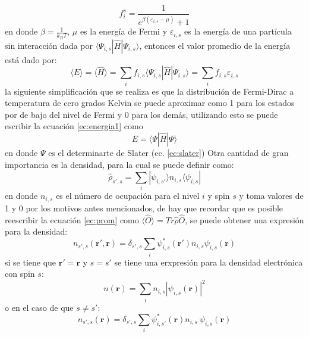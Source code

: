 \documentclass[12pt,a4paper, oneside]{book}
\begin{document}
	\begin{equation}
	f_{i}^{s}= \frac{1}{e^{\beta (\varepsilon_{i,s}-\mu)}+1} \label{ec:fermi-dirac}
	\end{equation}
	en donde $\beta= \frac{1}{k_B T}$, $\mu$ es la energ\'ia de Fermi y $\varepsilon_{i,s}$ es la energ\'ia de una part\'icula sin interacci\'on dada por $\langle \Psi_{i,s} | \hat{H} | \Psi_{i,s}\rangle$, entonces el valor promedio de la energ\'ia est\'a dado por:
	\begin{equation}
	\langle E \rangle = \langle \hat{H} \rangle = \sum_{i} f_{i,s} \langle \Psi_{i,s} | \hat{H} | \Psi_{i,s}\rangle = \sum_{i} f_{i,s}  \varepsilon_{i,s} \label{ec:energia1}
	\end{equation}
	la siguiente simplificaci\'on que se realiza es que la distribuci\'on de Fermi-Dirac a temperatura de cero grados Kelvin se puede aproximar como 1 para los estados por de bajo del nivel de Fermi y 0 para los dem\'as, utilizando esto se puede escribir la ecuaci\'on \ref{ec:energia1} como
	\begin{equation}
	E= \langle \Psi | \hat{H} | \Psi \rangle \label{ec:energia}
	\end{equation}
	en donde $\Psi$ es el determinarte de Slater (ec. \ref{ec:slater})
	\newline
	Otra cantidad de gran importancia es la densidad, para la cual se puede definir como:
	\begin{equation}
	\hat{\rho}_{s ', s}= \sum_{i} | \psi_{i,s '} \rangle n_{i,s} \langle \psi_{i,s} | \label{ec:densidad}
	\end{equation}
	en donde $ n_{i,s} $ es el n\'umero de ocupaci\'on para el nivel $i$ y spin $s$ y toma valores de 1 y 0 por los motivos antes mencionados, de hay que recordar que es posible reescribir la ecuaci\'on \ref{ec:prom} como $\langle \hat{O} \rangle = Tr \hat{\rho} \hat{O}  $, se puede obtener una expresi\'on para la densidad:
	\begin{equation}
	n_{s ', s} (\pmb{r ', r} ) = \delta_{s',s} \sum_{i} \psi_{i,s} ^{ *} (\pmb{r'}) n_{i,s} \psi_{i,s } (\pmb{r})  \label{ec:densidadr}
	\end{equation}
	si se tiene que $\pmb{r'} = \pmb{r}  $ y $s = s '  $ se tiene una erxpresi\'on para la densidad electr\'onica con spin $s$:
	\begin{equation}
	n(\pmb{r})= \sum_{i} n_{i,s} | \psi_{i,s} (\pmb{r}) |^2 \label{ec:densTot}
	\end{equation}
	o en el caso de que $s \not = s '  $:
	\begin{equation}
	n_{s ', s }(\pmb{r})= \delta_{s',s} \sum_{i} \psi_{i,s '}^ {*} (\pmb{r}) n_{i,s}~ \psi_{i,s } (\pmb{r}) \label{ec:denspin}
	\end{equation}
\end{document}
